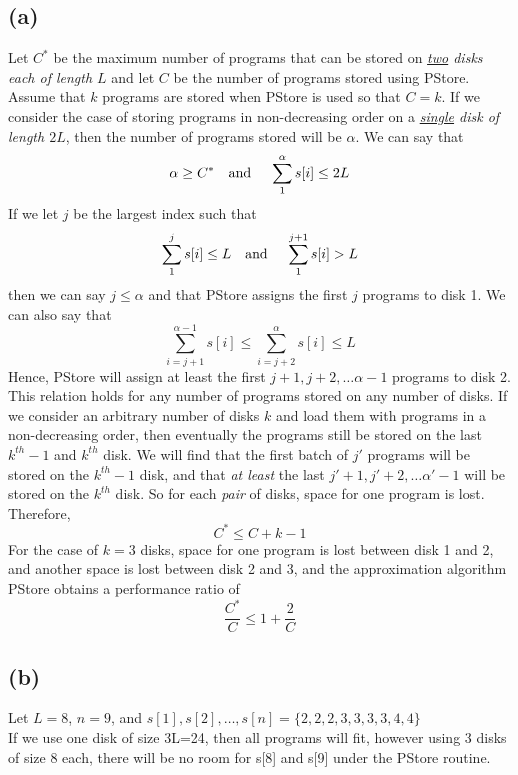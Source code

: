 	\subsection*{(a)}
		Let $C^*$ be the maximum number of programs that can be stored on \textit{\underline{two} disks each of length $L$} and let $C$ be the number of programs stored using PStore.
		Assume that $k$ programs are stored when PStore is used so that $C=k$. 
		If we consider the case of storing programs in non-decreasing order on a \textit{\underline{single} disk of length $2L$}, then the number of programs stored will be $\alpha$. 
		We can say that 
		\[\alpha \geq C^* \text{\quad and \quad} \sum_{1}^{\alpha}s[i] \leq 2L\]  
		If we let $j$ be the largest index such that
		\[\sum_{1}^{j}s[i] \leq L \text{\quad and \quad } \sum_{1}^{j+1}s[i] > L \] 
		then we can say $j\leq \alpha$ and that PStore assigns the first $j$ programs to disk 1. 
		We can also say that 
		\begin{equation*}
			\sum_{i = j+1}^{\alpha - 1}s[i] \leq \sum_{i = j+2}^{\alpha}s[i] \leq L
		\end{equation*}
		Hence, PStore will assign at least the first $j+1, j+2, \dots \alpha -1$ programs to disk 2. 
		This relation holds for any number of programs stored on any number of disks. 
		If we consider an arbitrary number of disks $k$ and load them with programs in a non-decreasing order, then eventually the programs still be stored on the last $k^{th}-1$ and $k^{th}$ disk. 
		We will find that the first batch of $j'$ programs will be stored on the $k^{th}-1$ disk, and that \textit{at least} the last $j'+1, j'+2, \dots \alpha' -1$ will be stored on the $k^{th}$ disk. 
		So for each \textit{pair} of disks, space for one program is lost. 
		Therefore, 
		\begin{equation*}
			C^* \leq C + k - 1
		\end{equation*}
		For the case of $k = 3$ disks, space for one program is lost between disk 1 and 2, and another space is lost between disk 2 and 3, and the approximation algorithm PStore obtains a performance ratio of 
		\begin{equation*}
			\frac{C^*}{C} \leq 1 + \frac{2}{C}
		\end{equation*} 
	\subsection*{(b)}
		Let $L=8$, $n=9$, and $s[1], s[2], \dots, s[n] = \{2, 2, 2, 3, 3, 3, 3, 4, 4\}$\\
		If we use one disk of size 3L=24, then all programs will fit, however using 3 disks of size 8 each, there will be no room for s[8] and s[9] under the PStore routine. 
		
